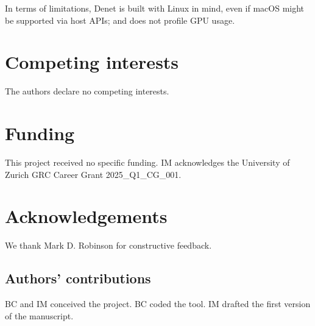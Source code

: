 \documentclass[10pt]{article}
\newcommand{\beginsupplement}{%
        \setcounter{table}{0}
        \renewcommand{\thetable}{S\arabic{table}}%
        \setcounter{figure}{0}
        \renewcommand{\thefigure}{S\arabic{figure}}%
        \setcounter{section}{0}
        \renewcommand{\thesection}{S\arabic{section}}%
      }
\begin{document}
In terms of limitations, Denet is built with Linux in mind, even if macOS might be supported via host APIs; and does not profile GPU usage.

\section*{Competing interests}
The authors declare no competing interests.

\section*{Funding}

This project received no specific funding. IM acknowledges the University of Zurich GRC Career Grant 2025\_Q1\_CG\_001.

\section*{Acknowledgements}

We thank Mark D. Robinson for constructive feedback.

\subsection*{Authors' contributions}

BC and IM conceived the project. BC coded the tool. IM drafted the first version of the manuscript.




\clearpage


\end{document}
